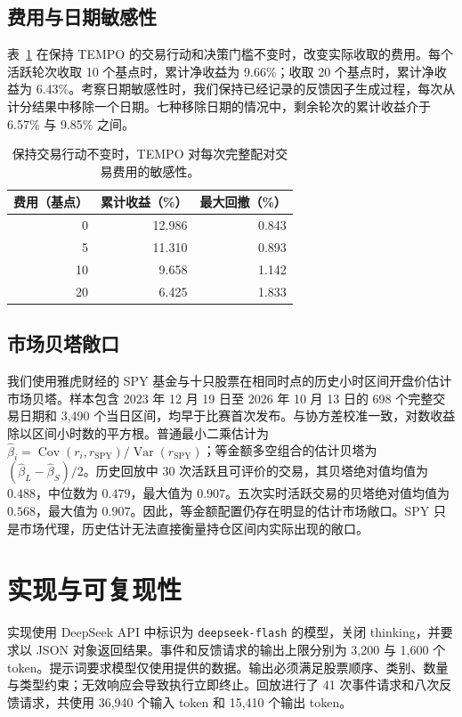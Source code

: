 \documentclass[conference]{IEEEtran}
\begin{document}
\subsection{费用与日期敏感性}
表~\ref{tab:cost} 在保持 TEMPO 的交易行动和决策门槛不变时，改变实际收取的费用。每个活跃轮次收取 10 个基点时，累计净收益为 9.66\%；收取 20 个基点时，累计净收益为 6.43\%。考察日期敏感性时，我们保持已经记录的反馈因子生成过程，每次从计分结果中移除一个日期。七种移除日期的情况中，剩余轮次的累计收益介于 6.57\% 与 9.85\% 之间。

\begin{table}[!tb]
\centering
\caption{保持交易行动不变时，TEMPO 对每次完整配对交易费用的敏感性。}
\label{tab:cost}
\begin{tabular}{rrr}
\toprule
费用（基点） & 累计收益（\%） & 最大回撤（\%）\\
\midrule
0 & 12.986 & 0.843\\
5 & 11.310 & 0.893\\
10 & 9.658 & 1.142\\
20 & 6.425 & 1.833\\
\bottomrule
\end{tabular}
\end{table}

\subsection{市场贝塔敞口}
我们使用雅虎财经的 SPY 基金与十只股票在相同时点的历史小时区间开盘价估计市场贝塔。样本包含 2023 年 12 月 19 日至 2026 年 10 月 13 日的 698 个完整交易日期和 3,490 个当日区间，均早于比赛首次发布。与协方差校准一致，对数收益除以区间小时数的平方根。普通最小二乘估计为 $\widehat\beta_i=\operatorname{Cov}(r_i,r_{\mathrm{SPY}})/\operatorname{Var}(r_{\mathrm{SPY}})$；等金额多空组合的估计贝塔为 $(\widehat\beta_L-\widehat\beta_S)/2$。历史回放中 30 次活跃且可评价的交易，其贝塔绝对值均值为 $0.488$，中位数为 $0.479$，最大值为 $0.907$。五次实时活跃交易的贝塔绝对值均值为 $0.568$，最大值为 $0.907$。因此，等金额配置仍存在明显的估计市场敞口。SPY 只是市场代理，历史估计无法直接衡量持仓区间内实际出现的敞口。

\section{实现与可复现性}
实现使用 DeepSeek API 中标识为 \texttt{deepseek-flash} 的模型，关闭 thinking，并要求以 JSON 对象返回结果。事件和反馈请求的输出上限分别为 3,200 与 1,600 个 token。提示词要求模型仅使用提供的数据。输出必须满足股票顺序、类别、数量与类型约束；无效响应会导致执行立即终止。回放进行了 41 次事件请求和八次反馈请求，共使用 36,940 个输入 token 和 15,410 个输出 token。
\end{document}
